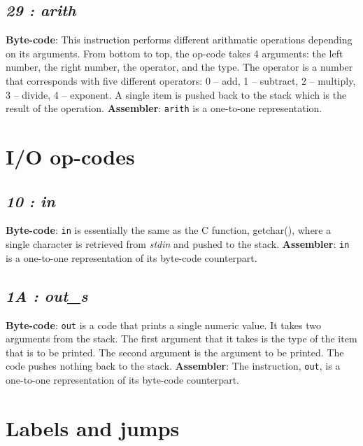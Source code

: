 \documentclass[12pt]{report}
\begin{document}
  \subsection{\emph{29 : arith}}
  \textbf{Byte-code}: This instruction performs different arithmatic operations
  depending on its arguments.  From bottom to top, the op-code takes 4
  arguments: the left number, the right number, the operator, and the type.  The
  operator is a number that corresponds with five different operators: 0 – add,
  1 – subtract, 2 – multiply, 3 – divide, 4 – exponent.  A single item is pushed back
  to the stack which is the result of the operation.
  \textbf{Assembler}: \verb|arith| is a one-to-one representation.

  \section{I/O op-codes}
  \subsection{\emph{10 : in}}
  \textbf{Byte-code}: \verb|in| is essentially the same as the C function, getchar(),
  where a single character is retrieved from \emph{stdin} and pushed to the stack.
  \newline
  \textbf{Assembler}: \verb|in| is a one-to-one representation of its byte-code
  counterpart.
  \subsection{\emph{1A : out\_s}}
  \textbf{Byte-code}: \verb|out| is a code that prints a single numeric value.  It
  takes two arguments from the stack.  The first argument that it takes is the 
  type of the item that is to be printed.  The second argument is the argument 
  to be printed.  The code pushes nothing back to the stack.\newline
  \textbf{Assembler}: The instruction, \verb|out|, is a one-to-one representation of
  its byte-code counterpart.

  \section{Labels and jumps}
\end{document}
